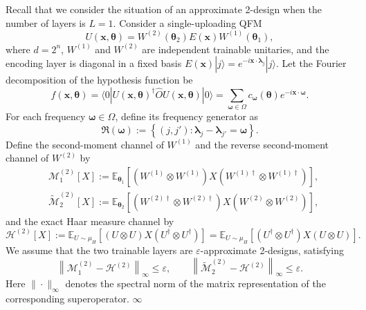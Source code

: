 \documentclass[%
 reprint,
 amsmath,amssymb,
 aps,
 pra,
]{revtex4-2}
\theoremstyle{definition}
\begin{document}
Recall that we consider the situation of an approximate 2-design when the number of layers is $L=1$. Consider a single-uploading QFM
\begin{equation}
U(\bm{x},\bm{\theta})
=
W^{(2)}(\bm{\theta}_2)E(\bm{x})W^{(1)}(\bm{\theta}_1),
\end{equation}
where $d=2^n$, $W^{(1)}$ and $W^{(2)}$ are independent trainable unitaries, and the encoding layer is diagonal in a fixed basis $E(\bm{x})|j\rangle=e^{-i\bm{x}\cdot\bm{\lambda}_j}|j\rangle$. Let the Fourier decomposition of the hypothesis function be
\begin{equation}
f(\bm{x},\bm{\theta})
=
\langle 0|
U(\bm{x},\bm{\theta})^\dagger
\hat O
U(\bm{x},\bm{\theta})
|0\rangle
=
\sum_{\bm{\omega}\in\Omega}
c_{\bm{\omega}}(\bm{\theta})
e^{-i\bm{x}\cdot\bm{\omega}}.
\end{equation}
For each frequency $\bm{\omega}\in\Omega$, define its frequency generator as
\begin{equation}
\mathfrak{R}(\bm{\omega})
:=
\left\{
(j,j'):\bm{\lambda}_{j}-\bm{\lambda}_{j'}=\bm{\omega}
\right\}.
\end{equation}
Define the second-moment channel of $W^{(1)}$ and the reverse second-moment channel of $W^{(2)}$ by
\begin{align}
&\mathcal{M}^{(2)}_1[X]
:=
\mathbb{E}_{\bm{\theta}_1}
\left[
(W^{(1)}\otimes W^{(1)})
X
(W^{(1)\dagger}\otimes W^{(1)\dagger})
\right],\\
&\widetilde{\mathcal{M}}^{(2)}_2[X]
:=
\mathbb{E}_{\bm{\theta}_2}
\left[
(W^{(2)\dagger}\otimes W^{(2)\dagger})
X
(W^{(2)}\otimes W^{(2)})
\right],
\end{align}
and the exact Haar measure channel by
\begin{equation}
\mathcal{H}^{(2)}[X]
:=
\mathbb{E}_{U\sim\mu_H}
\left[
(U\otimes U)
X
(U^\dagger\otimes U^\dagger)
\right]=\mathbb{E}_{U\sim\mu_H}
\left[
(U^\dagger\otimes U^\dagger)
X
(U\otimes U)
\right].
\end{equation}
We assume that the two trainable layers are $\varepsilon$-approximate 2-designs, satisfying
\begin{equation}
\left\|
\mathcal{M}^{(2)}_1-\mathcal{H}^{(2)}
\right\|_{\infty}
\leq
\varepsilon,
\qquad
\left\|
\widetilde{\mathcal{M}}^{(2)}_2-\mathcal{H}^{(2)}
\right\|_{\infty}
\leq
\varepsilon .
\end{equation}
Here $\|\cdot\|_{\infty}$ denotes the spectral norm of the matrix representation of the corresponding superoperator.  $\infty$
\end{document}

